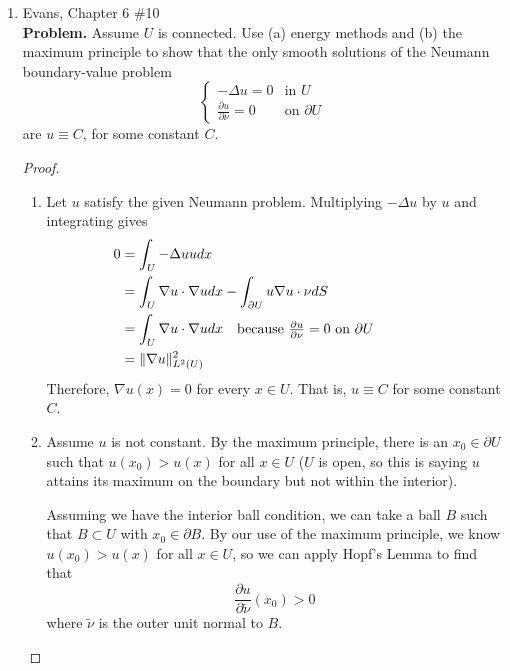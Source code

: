 \documentclass[a4paper]{article}
\newenvironment{problem}{\textbf{Problem.}}{}
\begin{document}
\begin{enumerate}
\begin{proof}
      Taking square roots gives
      \[ \| Du \|_{L^\infty(U)} \leq C \left( \| Du \|_{L^\infty(\partial U)} + \|u\|_{L^\infty(\partial U)} \right) \]
      with $C = \max \{1, \sqrt{2 \lambda} \}$.

    \end{proof}

  \item Evans, Chapter 6 \#10 \\
    \begin{problem}
      Assume $U$ is connected. Use (a) energy methods and (b) the maximum principle to show that the only smooth solutions of the Neumann
      boundary-value problem
      \[ \begin{cases}
          - \Delta u = 0 &\text{in } U \\
          \frac{\partial u}{\partial \nu} = 0 &\text{on } \partial U
      \end{cases} \]
      are $u \equiv C$, for some constant $C$.
    \end{problem}

      \begin{proof}
        \begin{enumerate}
          \item
            Let $u$ satisfy the given Neumann problem. Multiplying $-\Delta u$ by $u$ and integrating gives
            \begin{align*}
              0 &= \int_{U}^{} - \Delta u u dx \\
              &= \int_{U}^{} \nabla u \cdot \nabla u dx - \int_{\partial U}^{} u \nabla u \cdot \nu dS \\
              &= \int_{U}^{} \nabla u \cdot \nabla u dx \quad \parbox{5cm}{because $\frac{\partial u}{\partial \nu} =0$ on $\partial U$} \\
              &= \| \nabla u \|_{L^2(U)}^2
            \end{align*}
            Therefore, $\nabla u (x) = 0$ for every $x \in U$. That is, $u \equiv C$ for some constant $C$.

          \item
            Assume $u$ is not constant. By the maximum principle, there is an $x_0 \in \partial U$ such that $u(x_0) > u(x)$ for all $x \in U$ ($U$ is
            open, so this is saying $u$ attains its maximum on the boundary but not within the interior).

            Assuming we have the interior ball condition, we can take a ball $B$ such that $B \subset U$ with $x_0 \in \partial B$. By our use of the
            maximum principle, we know $u(x_0) > u(x)$ for all $x \in U$, so we can apply Hopf's Lemma to find that
            \[ \frac{\partial u}{\partial \tilde{\nu}} (x_0) > 0 \]
            where $\tilde{\nu}$ is the outer unit normal to $B$.


\end{enumerate}
\end{proof}
\end{enumerate}
\end{document}
